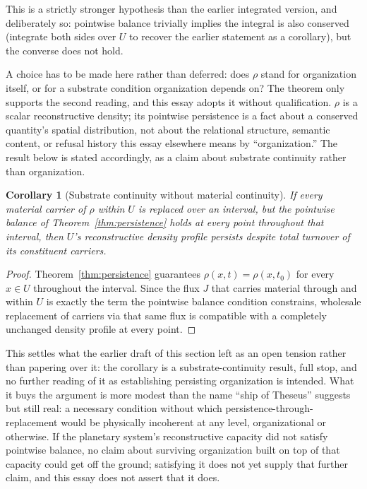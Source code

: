 \documentclass[11pt]{article}
\newtheorem{corollary}{Corollary}
\begin{document}
This is a strictly stronger hypothesis than the earlier integrated version, and deliberately so: pointwise balance trivially implies the integral is also conserved (integrate both sides over $U$ to recover the earlier statement as a corollary), but the converse does not hold.

A choice has to be made here rather than deferred: does $\rho$ stand for organization itself, or for a substrate condition organization depends on? The theorem only supports the second reading, and this essay adopts it without qualification. $\rho$ is a scalar reconstructive density; its pointwise persistence is a fact about a conserved quantity's spatial distribution, not about the relational structure, semantic content, or refusal history this essay elsewhere means by ``organization.'' The result below is stated accordingly, as a claim about substrate continuity rather than organization.

\begin{corollary}[Substrate continuity without material continuity]
\label{cor:ship-of-theseus}
If every material carrier of $\rho$ within $U$ is replaced over an interval, but the pointwise balance of Theorem~\ref{thm:persistence} holds at every point throughout that interval, then $U$'s reconstructive density profile persists despite total turnover of its constituent carriers.
\end{corollary}

\begin{proof}
Theorem~\ref{thm:persistence} guarantees $\rho(x,t)=\rho(x,t_0)$ for every $x\in U$ throughout the interval. Since the flux $J$ that carries material through and within $U$ is exactly the term the pointwise balance condition constrains, wholesale replacement of carriers via that same flux is compatible with a completely unchanged density profile at every point.
\end{proof}

This settles what the earlier draft of this section left as an open tension rather than papering over it: the corollary is a substrate-continuity result, full stop, and no further reading of it as establishing persisting organization is intended. What it buys the argument is more modest than the name ``ship of Theseus'' suggests but still real: a necessary condition without which persistence-through-replacement would be physically incoherent at any level, organizational or otherwise. If the planetary system's reconstructive capacity did not satisfy pointwise balance, no claim about surviving organization built on top of that capacity could get off the ground; satisfying it does not yet supply that further claim, and this essay does not assert that it does.
\end{document}
